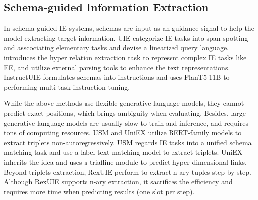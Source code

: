 \subsection{Schema-guided Information Extraction}

In schema-guided IE systems, schemas are input as an guidance signal to help the model extracting target information.
UIE \cite{uie} categorize IE tasks into span spotting and asscociating elementary tasks and devise a linearized query language.
\citet{lasuie} introduces the hyper relation extraction task to represent complex IE tasks like EE, and utilize external parsing tools to enhance the text representations.
InstructUIE \cite{instructuie} formulates schemas into instructions and uses FlanT5-11B \cite{flan-t5} to performing multi-task instruction tuning.

While the above methods use flexible generative language models, they cannot predict exact positions, which brings ambiguity when evaluating.
Besides, large generative language models are usually slow to train and inference, and requires tons of computing resources.
USM \cite{usm} and UniEX \cite{uniex} utilize BERT-family models to extract triplets non-autoregressively.
USM regards IE tasks into a unified schema matching task and use a label-text matching model to extract triplets.
UniEX inherits the idea and uses a triaffine module to predict hyper-dimensional links.
Beyond triplets extraction, RexUIE \cite{rexuie} perform to extract n-ary tuples step-by-step.
Although RexUIE supports n-ary extraction, it sacrifices the efficiency and requires more time when predicting results (one slot per step).
